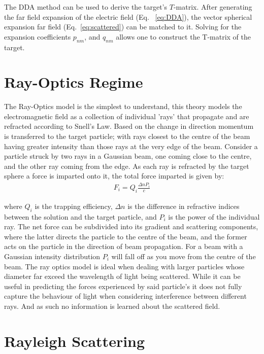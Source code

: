 The DDA method can be used to derive the target's $T$-matrix. After
generating the far field expansion of the electric field (Eq.~
\eqref{eq:DDA}), the vector spherical expansion far field 
(Eq.~\eqref{eq:scattered}) can be matched to it. Solving for the 
expansion coefficients $p_{nm}$, and $q_{nm}$ allows one to construct
the T-matrix of the target. 
\newpage

\section{Ray-Optics Regime}

The Ray-Optics model is the simplest to understand, this theory models 
the electromagnetic field as a collection of individual 'rays' that 
propagate and are refracted according to Snell's Law. Based on the 
change in direction momentum is transferred to the target particle; 
with rays closest to the centre of the beam having greater intensity 
than those rays at the very edge of the beam. Consider a particle 
struck by two rays in a Gaussian beam, one coming close to the centre, 
and the other ray coming from the edge. As each ray is refracted by 
the target sphere a force is imparted onto it, the total force 
imparted is given by:
\begin{align}
	F_i = Q_i\frac{\Delta n P_i}{c}
\end{align}

\noindent 
where $Q_i$ is the trapping efficiency, $\Delta n$ is the difference
in refractive indices between the solution and the target particle,
and $P_i$ is the power of the individual ray. The net force can be 
subdivided into its gradient and scattering components, where the latter
directs the particle to the centre of the beam, and the former acts on 
the particle in the direction of beam propagation. For a beam with a
Gaussian intensity distribution $P_i$ will fall off as you move from
the centre of the beam. The ray optics model is ideal when dealing 
with larger particles whose diameter far exceed the wavelength of light
being scattered. While it can be useful in predicting the forces 
experienced by said particle's it does not fully capture the behaviour
of light when considering interference between different rays. And 
as such no information is learned about the scattered field.

\section{Rayleigh Scattering}


